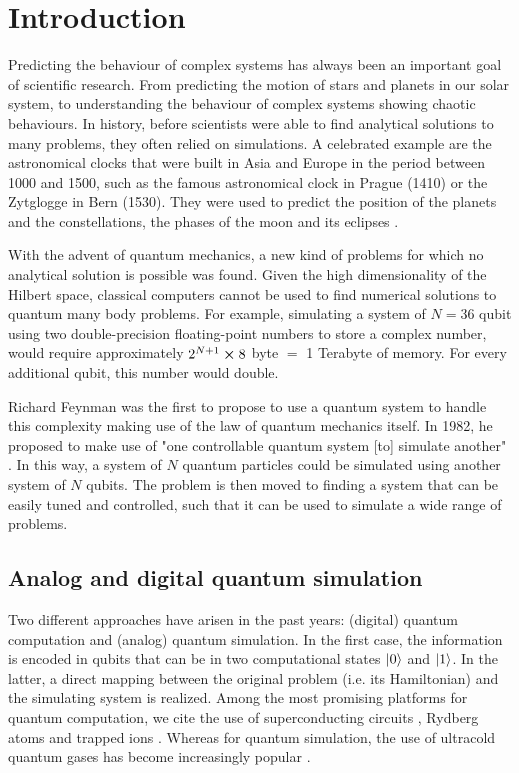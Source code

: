 \chapter{Introduction}

Predicting the behaviour of complex systems has always been an important goal of scientific research. From predicting the motion of stars and planets in our solar system, to understanding the behaviour of complex systems showing chaotic behaviours. In history, before scientists were able to find analytical solutions to many problems, they often relied on simulations. A
celebrated example are the astronomical clocks that
were built in Asia and Europe in the period between 1000 and
1500, such as the famous astronomical clock in Prague (1410) or the Zytglogge in Bern (1530). They were used to predict the position of the planets and the constellations, the phases of the moon and its eclipses \cite{bloch2012}.

With the advent of quantum mechanics, a new kind of problems for which no analytical solution is possible was found. Given the high dimensionality of the Hilbert space, classical computers cannot be used to find numerical solutions to quantum many body problems. For example, simulating a system of $N=36$ qubit using two double-precision floating-point numbers to store a complex number, would require approximately $2^{N+1} \cross 8$ byte $=$ 1 Terabyte of memory. For every additional qubit, this number would double.

Richard Feynman was the first to propose to use a quantum system to handle this complexity making use of the law of quantum mechanics itself. In 1982, he proposed to make use of "one controllable quantum system [to] simulate another" \cite{feynman1982}. In this way, a system of $N$ quantum particles could be simulated using another system of $N$ qubits. The problem is then moved to finding a system that can be easily tuned and controlled, such that it can be used to simulate a wide range of problems.

\section{Analog and digital quantum simulation}

Two different approaches have arisen in the past years: (digital) quantum computation and (analog) quantum simulation. In the first case, the information is encoded in qubits that can be in two computational states $\ket{0}$ and $\ket{1}$. In the latter, a direct mapping between the original problem (i.e. its Hamiltonian) and the simulating system is realized. Among the most promising platforms for quantum computation, we cite the use of superconducting circuits \cite{blais2021a}, Rydberg atoms \cite{wu2021a} and trapped ions \cite{bruzewicz2019}. Whereas for quantum simulation, the use of ultracold quantum gases has become increasingly popular \cite{bloch2012}.

